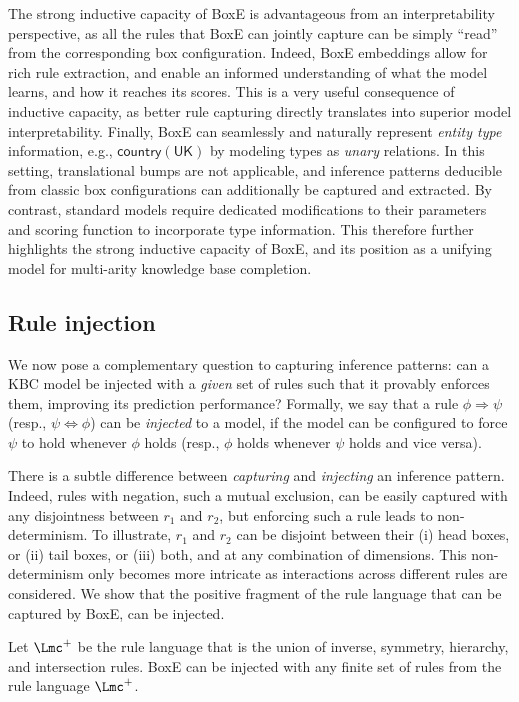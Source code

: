 \documentclass{article}
\begin{document}
The strong inductive capacity of BoxE is advantageous from an interpretability perspective, as all the rules that BoxE can jointly capture can be simply ``read'' from the corresponding box configuration. Indeed, BoxE embeddings allow for rich rule extraction, and enable an informed understanding of what the model learns, and how it reaches its scores. This is a very useful consequence of inductive capacity, as better rule capturing directly translates into superior model interpretability. Finally, BoxE can seamlessly and naturally represent \emph{entity type} information, e.g., $\mathsf{country(UK)}$ by modeling types as \emph{unary} relations. In this setting, translational bumps are not applicable, and inference patterns deducible from classic box configurations can additionally be captured and extracted. By contrast, standard models require dedicated modifications to their parameters and scoring function \cite{XieLS16,ChangYYM14,LvHLL18} to incorporate type information. This therefore further highlights the strong inductive capacity of BoxE, and its position as a unifying model for multi-arity knowledge base completion. 



\subsection{Rule injection}
We now pose a complementary question to capturing inference patterns: can a KBC model be injected with a \emph{given} set of rules such that it provably enforces them, improving its prediction performance? 
Formally, we say that a rule $\phi \Rightarrow \psi$ (resp., $\psi \Leftrightarrow \phi$) can be \emph{injected} to a model, if the model can be configured to force $\psi$ to hold whenever $\phi$ holds (resp., $\phi$ holds whenever $\psi$ holds and vice versa). 

There is a subtle difference between \emph{capturing}  and \emph{injecting} an inference pattern. Indeed, rules with negation, such a mutual exclusion, can be easily captured with any disjointness between $r_1$ and $r_2$, but enforcing such a rule leads to non-determinism. 
To illustrate, $r_1$ and $r_2$ can be disjoint between their (i) head boxes, or (ii) tail boxes, or (iii) both, and at any combination of dimensions. This non-determinism only becomes more intricate as interactions across different rules are considered. We show that the positive fragment of the rule language that can be captured by BoxE, can be injected. 
\begin{theorem}
\label{thm:ruleInj}
Let $\Lmc^+$ be the rule language that is the union of inverse, symmetry, hierarchy, and intersection rules.
BoxE can be injected with any finite set of rules from the rule language $\Lmc^+$.
\end{theorem}
\end{document}
